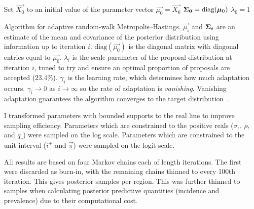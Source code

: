\documentclass[thesis.tex]{subfiles}
\begin{document}
\begin{algorithm}
 Set $\vec{X_0}$ to an initial value of the parameter vector \;
 $\vec{\mu_0} = \vec{X_0}$ \;
 $\bm{\Sigma_0} = \text{diag}(\bm{\mu_0})$ \;
 $\lambda_0 = 1$ \;
 \caption{Algorithm for adaptive random-walk Metropolis--Hastings. $\vec{\mu_i}$ and $\bm{\Sigma_i}$ are an estimate of the mean and covariance of the posterior distribution using information up to iteration $i$. $\text{diag}(\vec{\mu_0})$ is the diagonal matrix with diagonal entries equal to $\vec{\mu_0}$. $\lambda_i$ is the scale parameter of the proposal distribution at iteration $i$, tuned to try and ensure an optimal proportion of proposals are accepted (23.4\%). $\gamma_i$ is the learning rate, which determines how much adaptation occurs. $\gamma_i \to 0$ as $i \to \infty$ so the rate of adaptation is \emph{vanishing}. Vanishing adaptation guarantees the algorithm converges to the target distribution~\autocite[section 3]{andrieuTutorial}.}
 \label{SEIR:MCMC-algorithm}
\end{algorithm}

I transformed parameters with bounded supports to the real line to improve sampling efficiency.
Parameters which are constrained to the positive reals ($\sigma_\epsilon$, $\rho$, and $q_c$) were sampled on the log scale.
Parameters which are constrained to the unit interval ($i^+$ and $\vec{\pi}$) were sampled on the logit scale.

All results are based on four Markov chains each of length  iterations.
The first  were discarded as burn-in, with the remaining chains thinned to every 100th iteration.
This gives  posterior samples per region.
This was further thinned to  samples when calculating posterior predictive quantities (incidence and prevalence) due to their computational cost.
\end{document}
